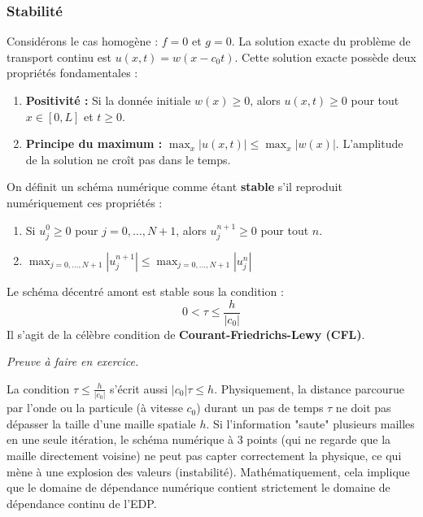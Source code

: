 \subsubsection{Stabilité}

Considérons le cas homogène : $f=0$ et $g=0$. La solution exacte du problème de transport continu est $u(x,t) = w(x - c_0 t)$.
Cette solution exacte possède deux propriétés fondamentales :
\begin{enumerate}
    \item \textbf{Positivité :} Si la donnée initiale $w(x) \ge 0$, alors $u(x,t) \ge 0$ pour tout $x \in [0,L]$ et $t \ge 0$.
    \item \textbf{Principe du maximum :} $\max_x |u(x,t)| \le \max_x |w(x)|$. L'amplitude de la solution ne croît pas dans le temps.
\end{enumerate}

On définit un schéma numérique comme étant \textbf{stable} s'il reproduit numériquement ces propriétés :
\begin{enumerate}
    \item Si $u_j^0 \ge 0$ pour $j=0, \dots, N+1$, alors $u_j^{n+1} \ge 0$ pour tout $n$.
    \item $\max_{j=0,\dots,N+1} |u_j^{n+1}| \le \max_{j=0,\dots,N+1} |u_j^n|$
\end{enumerate}

\begin{proposition}
Le schéma décentré amont est stable sous la condition :
\begin{equation*}
0 < \tau \le \frac{h}{|c_0|}
\end{equation*}
Il s'agit de la célèbre condition de \textbf{Courant-Friedrichs-Lewy (CFL)}.
\end{proposition}

\textit{Preuve à faire en exercice.}

\begin{explication}
La condition $\tau \le \frac{h}{|c_0|}$ s'écrit aussi $|c_0| \tau \le h$. Physiquement, la distance parcourue par l'onde ou la particule (à vitesse $c_0$) durant un pas de temps $\tau$ ne doit pas dépasser la taille d'une maille spatiale $h$. Si l'information "saute" plusieurs mailles en une seule itération, le schéma numérique à 3 points (qui ne regarde que la maille directement voisine) ne peut pas capter correctement la physique, ce qui mène à une explosion des valeurs (instabilité). Mathématiquement, cela implique que le domaine de dépendance numérique contient strictement le domaine de dépendance continu de l'EDP.
\end{explication}

